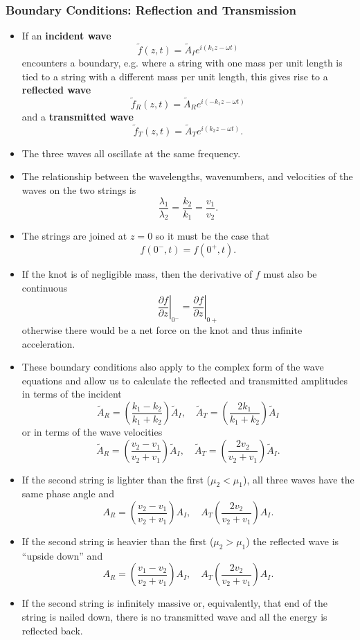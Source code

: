 \documentclass{article}
\begin{document}
\subsubsection{Boundary Conditions: Reflection and Transmission}

\begin{itemize}
  \item If an \textbf{incident wave} \[\tilde{f}(z, t) = \tilde{A}_I e^{i (k_1 z - \omega t)}\] encounters a boundary, e.g. where a string with one mass per unit length is tied to a string with a different mass per unit length, this gives rise to a \textbf{reflected wave} \[\tilde{f}_R(z, t) = \tilde{A}_R e^{i (-k_1 z - \omega t)}\] and a \textbf{transmitted wave} \[\tilde{f}_T(z, t) = \tilde{A}_T e^{i (k_2 z - \omega t)}.\]

  \item The three waves all oscillate at the same frequency.

  \item The relationship between the wavelengths, wavenumbers, and velocities of the waves on the two strings is \[\frac{\lambda_1}{\lambda_2} = \frac{k_2}{k_1} = \frac{v_1}{v_2}.\]

  \item The strings are joined at $z = 0$ so it must be the case that \[f(0^-, t) = f(0^+, t).\]

  \item If the knot is of negligible mass, then the derivative of $f$ must also be continuous \[\left. \frac{\partial f}{\partial z} \right|_{0^-} = \left. \frac{\partial f}{\partial z} \right|_{0+}\] otherwise there would be a net force on the knot and thus infinite acceleration.

  \item These boundary conditions also apply to the complex form of the wave equations and allow us to calculate the reflected and transmitted amplitudes in terms of the incident \[\tilde{A}_R = \left( \frac{k_1 - k_2}{k_1 + k_2} \right) \tilde{A}_I, \quad \tilde{A}_T = \left( \frac{2 k_1}{k_1 + k_2} \right) \tilde{A}_I\] or in terms of the wave velocities \[\tilde{A}_R = \left( \frac{v_2 - v_1}{v_2 + v_1} \right) \tilde{A}_I, \quad \tilde{A}_T = \left( \frac{2 v_2}{v_2 + v_1} \right) \tilde{A}_I.\]

  \item If the second string is lighter than the first ($\mu_2 < \mu_1$), all three waves have the same phase angle and \[A_R = \left( \frac{v_2 - v_1}{v_2 + v_1} \right) A_I, \quad A_T \left( \frac{2 v_2}{v_2 + v_1} \right) A_I.\]

  \item If the second string is heavier than the first ($\mu_2 > \mu_1$) the reflected wave is ``upside down'' and \[A_R = \left( \frac{v_1 - v_2}{v_2 + v_1} \right) A_I, \quad A_T \left( \frac{2 v_2}{v_2 + v_1} \right) A_I.\]

  \item If the second string is infinitely massive or, equivalently, that end of the string is nailed down, there is no transmitted wave and all the energy is reflected back.
\end{itemize}
\end{document}
